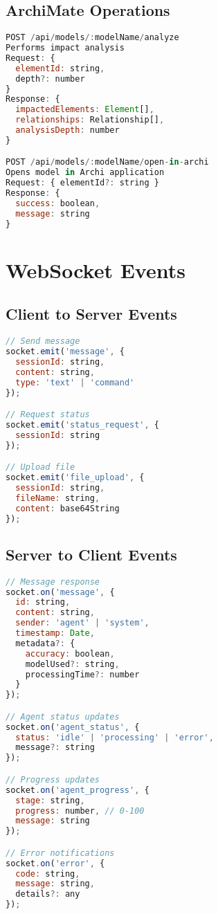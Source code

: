\documentclass[12pt,a4paper]{report}
\begin{document}
\subsection{ArchiMate Operations}

\begin{lstlisting}[language=JavaScript, caption=ArchiMate Operations API]
POST /api/models/:modelName/analyze
Performs impact analysis
Request: {
  elementId: string,
  depth?: number
}
Response: {
  impactedElements: Element[],
  relationships: Relationship[],
  analysisDepth: number
}

POST /api/models/:modelName/open-in-archi
Opens model in Archi application
Request: { elementId?: string }
Response: {
  success: boolean,
  message: string
}
\end{lstlisting}

\section{WebSocket Events}

\subsection{Client to Server Events}

\begin{lstlisting}[language=JavaScript, caption=Client Events]
// Send message
socket.emit('message', {
  sessionId: string,
  content: string,
  type: 'text' | 'command'
});

// Request status
socket.emit('status_request', {
  sessionId: string
});

// Upload file
socket.emit('file_upload', {
  sessionId: string,
  fileName: string,
  content: base64String
});
\end{lstlisting}

\subsection{Server to Client Events}

\begin{lstlisting}[language=JavaScript, caption=Server Events]
// Message response
socket.on('message', {
  id: string,
  content: string,
  sender: 'agent' | 'system',
  timestamp: Date,
  metadata?: {
    accuracy: boolean,
    modelUsed?: string,
    processingTime?: number
  }
});

// Agent status updates
socket.on('agent_status', {
  status: 'idle' | 'processing' | 'error',
  message?: string
});

// Progress updates
socket.on('agent_progress', {
  stage: string,
  progress: number, // 0-100
  message: string
});

// Error notifications
socket.on('error', {
  code: string,
  message: string,
  details?: any
});
\end{lstlisting}
\end{document}
